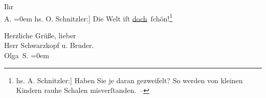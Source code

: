\pstart
           Ihr{\\[\baselineskip]}\spacefill\mbox{A.}\pend
           \leftskip=0em{}\vspace{1em}
\pstart
           \noindent{}{[}hs. O. Schnitzler:{]} Die Welt iſt \uline{doch} ſchön!\footnote{\noindent{}{[}hs. A. Schnitzler:{]} Haben Sie je daran gezweifelt? So werden von
                     kleinen Kindern rauhe Schalen misverſtanden. –}\pend
           
\pstart
           Herzliche Grüße, lieber{\\[\baselineskip]} Herr Schwarzkopf u. Bruder.{\\[\baselineskip]}\spacefill\mbox{Olga S.}\pend
           \leftskip=0em{}\endnumbering{}
\begin{anhang}
\end{anhang}\newcommand{\dateiname}{L04071}\newcommand{\titel}{Arthur und Olga Schnitzler an Gustav Schwarzkopf, 9. 5. 1904}\newcommand{\editorInnen}{Herausgegeben von Jahnke, SelmaMüller, Martin Anton}
